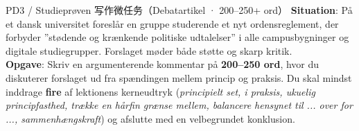 \begin{emailbox}{PD3 / Studieprøven 写作微任务（Debatartikel · 200--250+ ord）}
\textbf{Situation}: På et dansk universitet foreslår en gruppe studerende et nyt ordensreglement, der forbyder ”stødende og krænkende politiske udtalelser” i alle campusbygninger og digitale studiegrupper. Forslaget møder både støtte og skarp kritik.\\[3pt]
\textbf{Opgave}: Skriv en argumenterende kommentar på \textbf{200--250 ord}, hvor du diskuterer forslaget ud fra spændingen mellem princip og praksis. Du skal mindst inddrage \textbf{fire} af lektionens kerneudtryk (\textit{principielt set, i praksis, ukuelig principfasthed, trække en hårfin grænse mellem, balancere hensynet til ... over for ..., sammenhængskraft}) og afslutte med en velbegrundet konklusion.
\end{emailbox}


